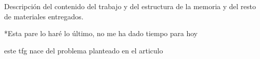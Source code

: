 
Descripción del contenido del trabajo y del estructura de la memoria y del resto de materiales entregados.

*Esta pare lo haré lo último, no me ha dado tiempo para hoy

este tfg nace del problema planteado en el articulo